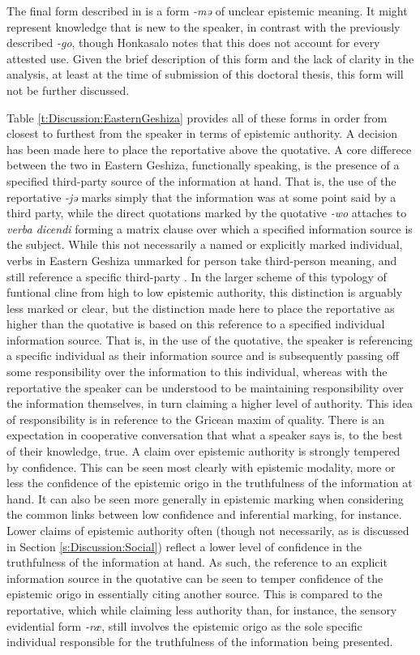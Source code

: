 The final form described in  is a form \textit{-mə} of unclear epistemic meaning. It might represent knowledge that is new to the speaker, in contrast with the previously described \textit{-go}, though Honkasalo notes that this does not account for every attested use. Given the brief description of this form and the lack of clarity in the analysis, at least at the time of submission of this doctoral thesis, this form will not be further discussed.

Table \ref{t:Discussion:EasternGeshiza} provides all of these forms in order from closest to furthest from the speaker in terms of epistemic authority. A decision has been made here to place the reportative above the quotative. A core differece between the two in Eastern Geshiza, functionally speaking, is the presence of a specified third-party source of the information at hand. That is, the use of the reportative \textit{-jə} marks simply that the information was at some point said by a third party, while the direct quotations marked by the quotative \textit{-wo} attaches to \textit{verba dicendi} forming a matrix clause over which a specified information source is the subject. While this not necessarily a named or explicitly marked individual, verbs in Eastern Geshiza unmarked for person take third-person meaning, and still reference a specific third-party \cite[592]{Honkasalo2019}. In the larger scheme of this typology of funtional cline from high to low epistemic authority, this distinction is arguably less marked or clear, but the distinction made here to place the reportative as higher than the quotative is based on this reference to a specified individual information source. That is, in the use of the quotative, the speaker is referencing a specific individual as their information source and is subsequently passing off some responsibility over the information to this individual, whereas with the reportative the speaker can be understood to be maintaining responsibility over the information themselves, in turn claiming a higher level of authority. This idea of responsibility is in reference to the Gricean maxim of quality. There is an expectation in cooperative conversation that what a speaker says is, to the best of their knowledge, true. A claim over epistemic authority is strongly tempered by confidence. This can be seen most clearly with epistemic modality, more or less the confidence of the epistemic origo in the truthfulness of the information at hand. It can also be seen more generally in epistemic marking when considering the common links between low confidence and inferential marking, for instance. Lower claims of epistemic authority often (though not necessarily, as is discussed in Section \ref{s:Discussion:Social}) reflect a lower level of confidence in the truthfulness of the information at hand. As such, the reference to an explicit information source in the quotative can be seen to temper confidence of the epistemic origo in essentially citing another source. This is compared to the reportative, which while claiming less authority than, for instance, the sensory evidential form \textit{-ræ}, still involves the epistemic origo as the sole specific individual responsible for the truthfulness of the information being presented. 